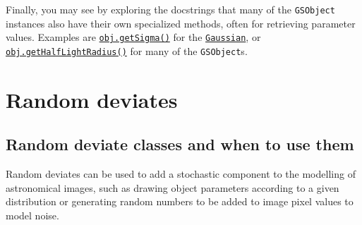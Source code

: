 \documentclass[preprint,11pt]{../../devel/modules/aastex}
\begin{document}
Finally, you may see by exploring the docstrings that many of the \texttt{GSObject}
instances also have their own specialized methods, often for
retrieving parameter values. Examples are
\href{http://galsim-developers.github.com/GalSim/classgalsim_1_1base_1_1_gaussian.html#a418f2826a7b8934cfedc181de23ce826}{\texttt{obj.getSigma()}}
for the
\href{http://galsim-developers.github.com/GalSim/classgalsim_1_1base_1_1_gaussian.html}{\texttt{Gaussian}},
or
\href{http://galsim-developers.github.com/GalSim/classgalsim_1_1base_1_1_sersic.html#ad6ca39293c6b478fc052d07ea51d086f}{\texttt{obj.getHalfLightRadius()}}
for many of the \texttt{GSObject}s.

\section{Random deviates}\label{sect:random}
\subsection{Random deviate classes and when to use them}
Random deviates can be used to add a stochastic
component to the modelling of astronomical images, such as drawing
object parameters according to a given distribution or generating random
numbers to be added to image pixel values to model noise. 
\end{document}
